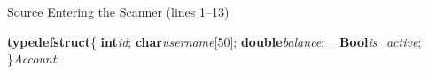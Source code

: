 \documentclass[aspectratio=169]{beamer}
\newcommand{\KW}[1]{\textcolor{keywordcolor}{\textbf{#1}}}
\newcommand{\ID}[1]{\textcolor{identifiercolor}{\textit{#1}}}
\newcommand{\INT}[1]{\colorbox{integercolor!15}{\textcolor{integercolor}{#1}}}
\newcommand{\DELIM}[1]{\textcolor{delimitercolor}{#1}}
\begin{document}
\begin{frame}[fragile]{Source Entering the Scanner (lines 1--13)}
\tiny
\begin{block}{}
\ttfamily\obeylines


\KW{typedef}\hspace*{0.18em}\KW{struct}\hspace*{0.18em}\DELIM{\{}
\hspace*{0.18em}\hspace*{0.18em}\hspace*{0.18em}\hspace*{0.18em}\KW{int}\hspace*{0.18em}\ID{id}\DELIM{;}
\hspace*{0.18em}\hspace*{0.18em}\hspace*{0.18em}\hspace*{0.18em}\KW{char}\hspace*{0.18em}\ID{username}\DELIM{[}\INT{50}\DELIM{]}\DELIM{;}
\hspace*{0.18em}\hspace*{0.18em}\hspace*{0.18em}\hspace*{0.18em}\KW{double}\hspace*{0.18em}\ID{balance}\DELIM{;}
\hspace*{0.18em}\hspace*{0.18em}\hspace*{0.18em}\hspace*{0.18em}\KW{\_Bool}\hspace*{0.18em}\ID{is\_active}\DELIM{;}
\DELIM{\}}\hspace*{0.18em}\ID{Account}\DELIM{;}


\end{block}
\end{frame}
\end{document}
